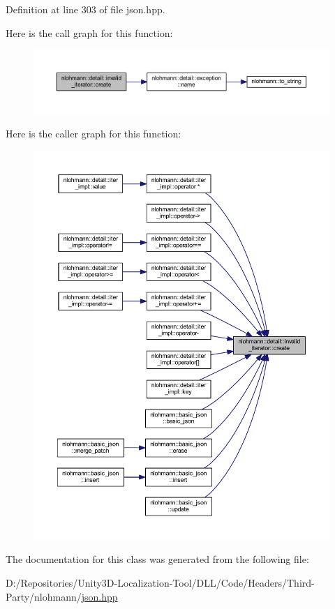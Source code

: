 Definition at line 303 of file json.\+hpp.

Here is the call graph for this function\+:
\nopagebreak
\begin{figure}[H]
\begin{center}
\leavevmode
\includegraphics[width=350pt]{classnlohmann_1_1detail_1_1invalid__iterator_a4e849260a3caa1b288c7e619130c6c09_cgraph}
\end{center}
\end{figure}
Here is the caller graph for this function\+:
\nopagebreak
\begin{figure}[H]
\begin{center}
\leavevmode
\includegraphics[width=350pt]{classnlohmann_1_1detail_1_1invalid__iterator_a4e849260a3caa1b288c7e619130c6c09_icgraph}
\end{center}
\end{figure}


The documentation for this class was generated from the following file\+:\begin{DoxyCompactItemize}
\item 
D\+:/\+Repositories/\+Unity3\+D-\/\+Localization-\/\+Tool/\+D\+L\+L/\+Code/\+Headers/\+Third-\/\+Party/nlohmann/\mbox{\hyperlink{json_8hpp}{json.\+hpp}}\end{DoxyCompactItemize}
